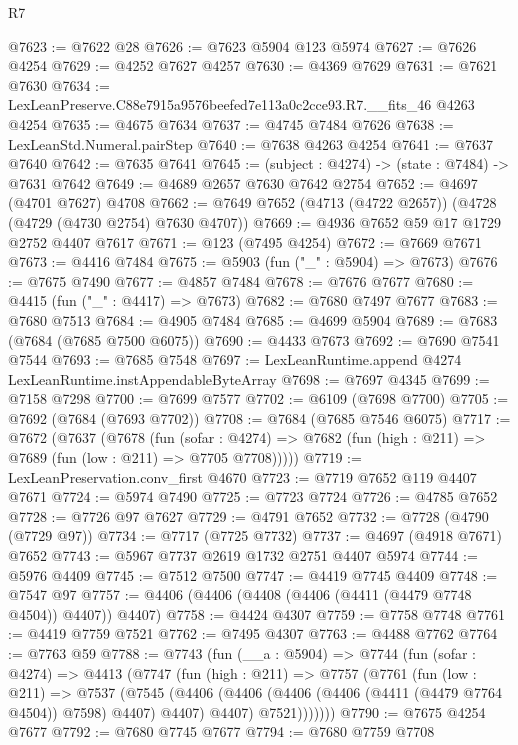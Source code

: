 \begin{lexlean}{R7}
\begin{coremodule}
@7623 := @7622 @28
@7626 := @7623 @5904 @123 @5974
@7627 := @7626 @4254
@7629 := @4252 @7627 @4257
@7630 := @4369 @7629
@7631 := @7621 @7630
@7634 := LexLeanPreserve.C88e7915a9576beefed7e113a0c2cce93.R7.__fits_46 @4263 @4254
@7635 := @4675 @7634
@7637 := @4745 @7484 @7626
@7638 := LexLeanStd.Numeral.pairStep
@7640 := @7638 @4263 @4254
@7641 := @7637 @7640
@7642 := @7635 @7641
@7645 := (subject : @4274) -> (state : @7484) -> @7631 @7642
@7649 := @4689 @2657 @7630 @7642 @2754
@7652 := @4697 (@4701 @7627) @4708
@7662 := @7649 @7652 (@4713 (@4722 @2657)) (@4728 (@4729 (@4730 @2754) @7630 @4707))
@7669 := @4936 @7652 @59 @17 @1729 @2752 @4407 @7617
@7671 := @123 (@7495 @4254)
@7672 := @7669 @7671
@7673 := @4416 @7484
@7675 := @5903 (fun ("_" : @5904) => @7673)
@7676 := @7675 @7490
@7677 := @4857 @7484
@7678 := @7676 @7677
@7680 := @4415 (fun ("_" : @4417) => @7673)
@7682 := @7680 @7497 @7677
@7683 := @7680 @7513
@7684 := @4905 @7484
@7685 := @4699 @5904
@7689 := @7683 (@7684 (@7685 @7500 @6075))
@7690 := @4433 @7673
@7692 := @7690 @7541 @7544
@7693 := @7685 @7548
@7697 := LexLeanRuntime.append @4274 LexLeanRuntime.instAppendableByteArray
@7698 := @7697 @4345
@7699 := @7158 @7298
@7700 := @7699 @7577
@7702 := @6109 (@7698 @7700)
@7705 := @7692 (@7684 (@7693 @7702))
@7708 := @7684 (@7685 @7546 @6075)
@7717 := @7672
    (@7637
      (@7678
        (fun (sofar : @4274) =>
        @7682 (fun (high : @211) => @7689 (fun (low : @211) => @7705 @7708)))))
@7719 := LexLeanPreservation.conv_first @4670
@7723 := @7719 @7652 @119 @4407 @7671
@7724 := @5974 @7490
@7725 := @7723 @7724
@7726 := @4785 @7652
@7728 := @7726 @97 @7627
@7729 := @4791 @7652
@7732 := @7728 (@4790 (@7729 @97))
@7734 := @7717 (@7725 @7732)
@7737 := @4697 (@4918 @7671) @7652
@7743 := @5967 @7737 @2619 @1732 @2751 @4407 @5974
@7744 := @5976 @4409
@7745 := @7512 @7500
@7747 := @4419 @7745 @4409
@7748 := @7547 @97
@7757 := @4406 (@4406 (@4408 (@4406 (@4411 (@4479 @7748 @4504)) @4407)) @4407)
@7758 := @4424 @4307
@7759 := @7758 @7748
@7761 := @4419 @7759 @7521
@7762 := @7495 @4307
@7763 := @4488 @7762
@7764 := @7763 @59
@7788 := @7743
    (fun (__a : @5904) =>
    @7744
      (fun (sofar : @4274) =>
      @4413
        (@7747
          (fun (high : @211) =>
          @7757
            (@7761
              (fun (low : @211) =>
              @7537
                (@7545
                  (@4406
                    (@4406 (@4406 (@4406 (@4411 (@4479 @7764 @4504)) @7598) @4407) @4407)
                    @4407)
                  @7521)))))))
@7790 := @7675 @4254 @7677
@7792 := @7680 @7745 @7677
@7794 := @7680 @7759 @7708

\end{coremodule}
\end{lexlean}
